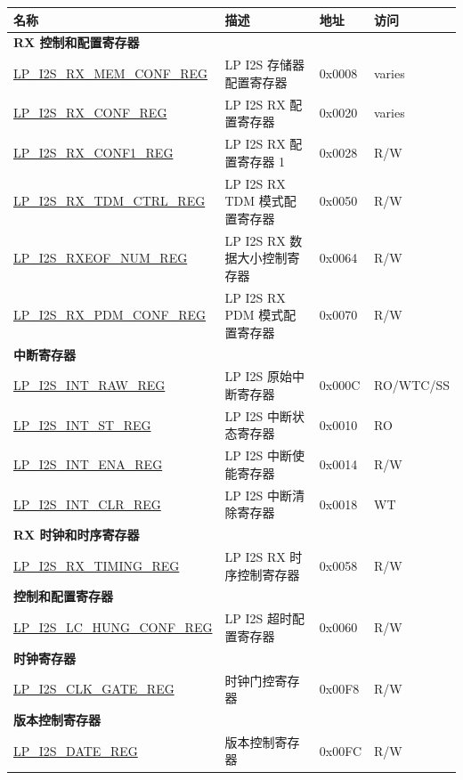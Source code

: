 \begin{longtable}{ | p{6cm} | p{6.2cm} | p{1.3cm} | p{2cm} | }
\hline\rowcolor{lightgray}
\textbf{名称} & \textbf{描述} &  \textbf{地址} & \textbf{访问} \\ \hline
\endhead
\multicolumn{4}{|l|}{\textbf{RX 控制和配置寄存器}} \\ \hline
\hyperref[regdesc:LPI2SRXMEMCONFREG]{LP\_I2S\_RX\_MEM\_CONF\_REG} & LP I2S 存储器配置寄存器 & 0x0008 & varies \\ \hline
\hyperref[regdesc:LPI2SRXCONFREG]{LP\_I2S\_RX\_CONF\_REG} & LP I2S RX 配置寄存器 & 0x0020 & varies \\ \hline
\hyperref[regdesc:LPI2SRXCONF1REG]{LP\_I2S\_RX\_CONF1\_REG} & LP I2S RX 配置寄存器 1 & 0x0028 & R/W \\ \hline
\hyperref[regdesc:LPI2SRXTDMCTRLREG]{LP\_I2S\_RX\_TDM\_CTRL\_REG} & LP I2S RX TDM 模式配置寄存器 & 0x0050 & R/W \\ \hline
\hyperref[regdesc:LPI2SRXEOFNUMREG]{LP\_I2S\_RXEOF\_NUM\_REG} & LP I2S RX 数据大小控制寄存器 & 0x0064 & R/W \\ \hline
\hyperref[regdesc:LPI2SRXPDMCONFREG]{LP\_I2S\_RX\_PDM\_CONF\_REG} & LP I2S RX PDM 模式配置寄存器 & 0x0070 & R/W \\ \hline
\multicolumn{4}{|l|}{\textbf{中断寄存器}} \\ \hline
\hyperref[regdesc:LPI2SINTRAWREG]{LP\_I2S\_INT\_RAW\_REG} & LP I2S 原始中断寄存器 & 0x000C & RO/WTC/SS \\ \hline
\hyperref[regdesc:LPI2SINTSTREG]{LP\_I2S\_INT\_ST\_REG} & LP I2S 中断状态寄存器 & 0x0010 & RO \\ \hline
\hyperref[regdesc:LPI2SINTENAREG]{LP\_I2S\_INT\_ENA\_REG} & LP I2S 中断使能寄存器 & 0x0014 & R/W \\ \hline
\hyperref[regdesc:LPI2SINTCLRREG]{LP\_I2S\_INT\_CLR\_REG} & LP I2S 中断清除寄存器 & 0x0018 & WT \\ \hline
\multicolumn{4}{|l|}{\textbf{RX 时钟和时序寄存器}} \\ \hline
\hyperref[regdesc:LPI2SRXTIMINGREG]{LP\_I2S\_RX\_TIMING\_REG} & LP I2S RX 时序控制寄存器 & 0x0058 & R/W \\ \hline
\multicolumn{4}{|l|}{\textbf{控制和配置寄存器}} \\ \hline
\hyperref[regdesc:LPI2SLCHUNGCONFREG]{LP\_I2S\_LC\_HUNG\_CONF\_REG} & LP I2S 超时配置寄存器 & 0x0060 & R/W \\ \hline
\multicolumn{4}{|l|}{\textbf{时钟寄存器}} \\ \hline
\hyperref[regdesc:LPI2SCLKGATEREG]{LP\_I2S\_CLK\_GATE\_REG} & 时钟门控寄存器 & 0x00F8 & R/W \\ \hline
\multicolumn{4}{|l|}{\textbf{版本控制寄存器}} \\ \hline
\hyperref[regdesc:LPI2SDATEREG]{LP\_I2S\_DATE\_REG} & 版本控制寄存器 & 0x00FC & R/W \\ \hline
\end{longtable}
